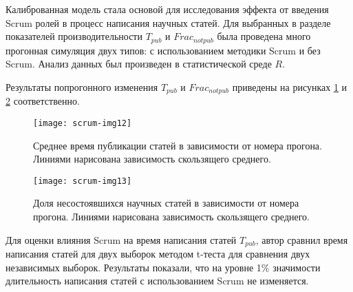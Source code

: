 \begin{table}[H]
\centering
\caption{Оптимальные значения параметров}
\label{tab:ex1}
\end{table}

Калиброванная модель стала основой для исследования эффекта от введения Scrum ролей в процесс написания научных статей.
Для выбранных в разделе показателей производительности $T_{pub}$ и $Frac_{notpub}$ была проведена много прогонная симуляция двух типов: с использованием методики Scrum и без Scrum. 
Анализ данных был произведен в статистической среде $R$.

Результаты попрогонного изменения $T_{pub}$ и $Frac_{notpub}$ приведены на рисунках \ref{ex:fig12} и \ref{ex:fig13} соответственно.
\begin{figure}[H]
  \caption{ Среднее время публикации статей в зависимости от номера прогона. Линиями нарисована зависимость скользящего среднего.}
  \centering
    \texttt{[image: scrum-img12]}
  \label{ex:fig12}
\end{figure}  

\begin{figure}[H]
  \caption{Доля несостоявшихся научных статей в зависимости от номера прогона. Линиями нарисована зависимость скользящего среднего.}
  \centering
    \texttt{[image: scrum-img13]}
  \label{ex:fig13}
\end{figure}  

Для оценки влияния Scrum на время написания статей $T_{pub}$, автор сравнил время написания статей для двух выборок методом t-теста для сравнения двух независимых выборок.
Результаты показали, что на уровне 1\% значимости длительность написания статей с использованием Scrum не изменяется.

